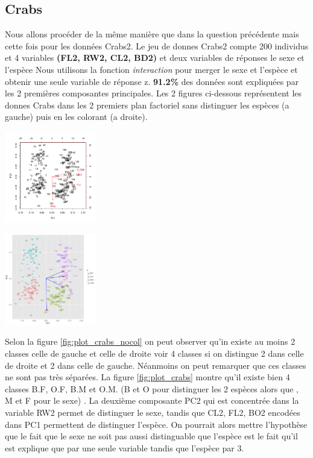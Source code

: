 \documentclass[10pt]{article}
\begin{document}
	\subsection{Crabs}
	Nous allons procéder de la même manière que dans la question précédente mais cette fois pour les données Crabs2. Le jeu de donnes Crabs2 compte 200 individus et 4 variables \textbf{(FL2, RW2,  CL2, BD2)}  et deux variables de réponses le sexe et l'espèce Nous utilisons la fonction \textit{interaction} pour merger le sexe et l'espèce et obtenir une seule variable de réponse z. \textbf{91.2\%} des données sont expliquées par les 2 premières composantes principales. Les 2 figures ci-dessous représentent les donnes Crabs dans les 2 premiers plan factoriel sans distinguer les espèces (a gauche) puis en les colorant (a droite).
	
	
			\begin{minipage}{.5\textwidth}
		\includegraphics[width=40mm]{Figures/Crabs2_1/plotnospieces.png}
		\label{fig:plot_crabs_nocol}
	\end{minipage}%
	\hspace{0.02\linewidth}
	\begin{minipage}{.5\textwidth}
		\includegraphics[width=40mm]{Figures/Crabs2_1/plotspieces.png}
		\label{fig:plot_crabs}
	\end{minipage}
	\vspace{0.2mm}
	
	Selon la figure \ref{fig:plot_crabs_nocol} on peut observer qu'in existe au moins 2 classes celle de gauche et celle de droite voir 4 classes si on distingue 2 dans celle de droite et 2 dans celle de gauche. Néanmoins on peut remarquer que ces classes ne sont pas très séparées. La figure \ref{fig:plot_crabs} montre qu'il existe bien 4 classes B.F, O.F, B.M et O.M. (B et O pour distinguer les 2 espèces alors que , M et F pour le sexe) . La deuxième composante PC2 qui est concentrée dans la variable RW2 permet de distinguer le sexe, tandis que CL2, FL2, BO2 encodées dans PC1 permettent de distinguer l'espèce. On pourrait alors mettre l'hypothèse  que le fait que le sexe ne soit pas aussi distinguable que l'espèce est le fait qu'il est explique que par une seule variable tandis que l'espèce par 3.
	
\end{document}
